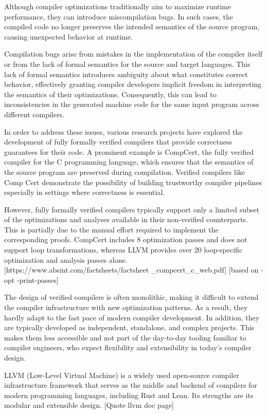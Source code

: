 Although compiler optimizations traditionally aim to maximize runtime performance, they can introduce miscompilation bugs. In such cases, the compiled code no longer preserves the intended semantics of the source program, causing unexpected behavior at runtime.

Compilation bugs arise from mistakes in the implementation of the compiler itself or from the lack of formal semantics for the source and target languages. This lack of formal semantics introduces ambiguity about what constitutes correct behavior, effectively granting compiler developers implicit freedom in interpreting the semantics of their optimizations. Consequently, this can lead to inconsistencies in the generated machine code for the same input program across different compilers.

In order to address these issues, various research projects have explored the development of fully formally verified compilers that provide correctness guarantees for their code. A prominent example is CompCert, the fully verified compiler for the C programming language, which ensures that the semantics of the source program are preserved during compilation. Verified compilers like Comp Cert demonstrate the possibility of building trustworthy compiler pipelines especially in settings where correctness is essential.  

However, fully formally verified compilers typically support only a limited subset of the optimizations and analyses available in their non-verified counterparts. This is partially due to the manual effort required to implement the corresponding proofs. CompCert includes 8 optimization passes and does not support loop transformations, whereas LLVM provides over 20 loop-specific optimization and analysis passes alone. [https://www.absint.com/factsheets/factsheet
\_compcert\_c\_web.pdf]
[based on -opt -print-passes]

The design of verified compilers is often monolithic, making it difficult to extend the compiler infrastructure with new optimization patterns. As a result, they hardly adapt to the fast pace of modern compiler development. In addition, they are typically developed as independent, standalone, and complex projects. This makes them less accessible and not part of the day-to-day tooling familiar to compiler engineers, who expect flexibility and extensibility in today's compiler design.

LLVM (Low-Level Virtual Machine) is a widely used open-source compiler infrastructure framework that serves as the middle and backend of compilers for  modern programming languages, including Rust and Lean. Its strengths are its modular and extensible design. [Quote llvm doc page]

